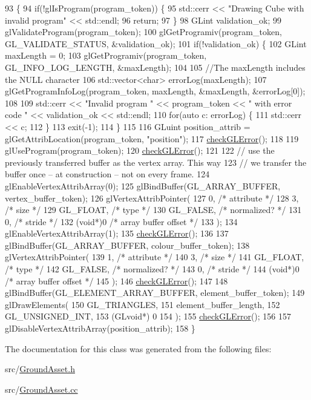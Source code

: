 \begin{DoxyCode}
93                                            \{
94   \textcolor{keywordflow}{if}(!glIsProgram(program\_token)) \{
95     std::cerr << \textcolor{stringliteral}{"Drawing Cube with invalid program"} << std::endl;
96     \textcolor{keywordflow}{return};
97   \}
98   GLint validation\_ok;
99   glValidateProgram(program\_token);
100   glGetProgramiv(program\_token, GL\_VALIDATE\_STATUS, &validation\_ok);
101   \textcolor{keywordflow}{if}(!validation\_ok) \{
102     GLint maxLength = 0;
103     glGetProgramiv(program\_token, GL\_INFO\_LOG\_LENGTH, &maxLength);
104 
105     \textcolor{comment}{//The maxLength includes the NULL character}
106     std::vector<char> errorLog(maxLength);
107     glGetProgramInfoLog(program\_token, maxLength, &maxLength, &errorLog[0]);
108 
109     std::cerr << \textcolor{stringliteral}{"Invalid program "} << program\_token << \textcolor{stringliteral}{" with error code "} << validation\_ok << std::endl;
110     \textcolor{keywordflow}{for}(\textcolor{keyword}{auto} c: errorLog) \{
111       std::cerr << c;
112     \}
113     exit(-1);
114   \}
115 
116   GLuint position\_attrib = glGetAttribLocation(program\_token, \textcolor{stringliteral}{"position"});
117   \hyperlink{GroundAsset_8cc_a75f201b0e53e68726854997957322b8d}{checkGLError}();
118 
119   glUseProgram(program\_token);
120   \hyperlink{GroundAsset_8cc_a75f201b0e53e68726854997957322b8d}{checkGLError}();
121 
122   \textcolor{comment}{// use the previously transferred buffer as the vertex array.  This way}
123   \textcolor{comment}{// we transfer the buffer once -- at construction -- not on every frame.}
124   glEnableVertexAttribArray(0);
125   glBindBuffer(GL\_ARRAY\_BUFFER, vertex\_buffer\_token);
126   glVertexAttribPointer(
127     0,        \textcolor{comment}{/* attribute */}
128     3,        \textcolor{comment}{/* size */}
129     GL\_FLOAT,   \textcolor{comment}{/* type */}
130     GL\_FALSE,   \textcolor{comment}{/* normalized? */}
131     0,        \textcolor{comment}{/* stride */}
132     (\textcolor{keywordtype}{void}*)0    \textcolor{comment}{/* array buffer offset */}
133   );
134   glEnableVertexAttribArray(1);
135   \hyperlink{GroundAsset_8cc_a75f201b0e53e68726854997957322b8d}{checkGLError}();
136 
137   glBindBuffer(GL\_ARRAY\_BUFFER, colour\_buffer\_token);
138   glVertexAttribPointer(
139     1,        \textcolor{comment}{/* attribute */}
140     3,        \textcolor{comment}{/* size */}
141     GL\_FLOAT,   \textcolor{comment}{/* type */}
142     GL\_FALSE,   \textcolor{comment}{/* normalized? */}
143     0,        \textcolor{comment}{/* stride */}
144     (\textcolor{keywordtype}{void}*)0    \textcolor{comment}{/* array buffer offset */}
145   );
146   \hyperlink{GroundAsset_8cc_a75f201b0e53e68726854997957322b8d}{checkGLError}();
147 
148   glBindBuffer(GL\_ELEMENT\_ARRAY\_BUFFER, element\_buffer\_token);
149   glDrawElements(
150     GL\_TRIANGLES,
151     element\_buffer\_length,
152     GL\_UNSIGNED\_INT,
153     (GLvoid*) 0
154   );
155   \hyperlink{GroundAsset_8cc_a75f201b0e53e68726854997957322b8d}{checkGLError}();
156 
157   glDisableVertexAttribArray(position\_attrib);
158 \}
\end{DoxyCode}


The documentation for this class was generated from the following files\+:\begin{DoxyCompactItemize}
\item 
src/\hyperlink{GroundAsset_8h}{Ground\+Asset.\+h}\item 
src/\hyperlink{GroundAsset_8cc}{Ground\+Asset.\+cc}\end{DoxyCompactItemize}
